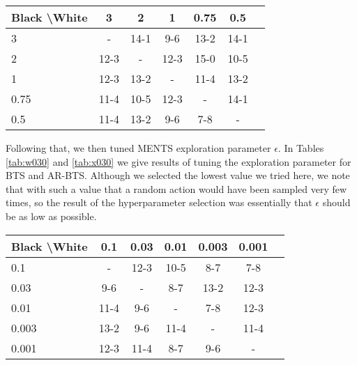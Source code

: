     \begin{table*}[]
    \centering
        \begin{tabular}{l|cccccc}
            \textbf{Black \textbackslash White}     & 3  & 2   & 1   & 0.75    & 0.5    \\ 
            \hline
                                    3            & - & 14-1 & 9-6 & 13-2 & 14-1   		\\
                                    2            & 12-3 & - & 12-3 & 15-0 & 10-5   		\\
                                    1          & 12-3 & 13-2 & - & 11-4 & 13-2   		\\
                                    0.75          & 11-4 & 10-5 & 12-3 & - & 14-1   		\\
                                    0.5         & 11-4 & 13-2 & 9-6 & 7-8 &   -   	\\   
        \end{tabular}
        \caption{Results for round robin to select the weighting of the prior policy $\epsilon_{\tilde{\lambda}}$ for AR-BTS. The value of 1.0 won the most matches so was selected. \label{tab:x020}}
    \end{table*}
    
    
    
    
    
    
    Following that, we then tuned MENTS exploration parameter $\epsilon$. In Tables \ref{tab:w030} and \ref{tab:x030} we give results of tuning the exploration parameter for BTS and AR-BTS. Although we selected the lowest value we tried here, we note that with such a value that a random action would have been sampled very few times, so the result of the hyperparameter selection was essentially that $\epsilon$ should be as low as possible.
    
    \begin{table*}[]
    \centering
        \begin{tabular}{l|cccccc}
            \textbf{Black \textbackslash White}     & 0.1  & 0.03   & 0.01   & 0.003    & 0.001    \\ 
            \hline
                                    0.1            & - & 12-3 & 10-5 & 8-7 & 7-8   		\\
                                    0.03            & 9-6 & - & 8-7 & 13-2 & 12-3   		\\
                                    0.01          & 11-4 & 9-6 & - & 7-8 & 12-3   		\\
                                    0.003          & 13-2 & 9-6 & 11-4 & - & 11-4   		\\
                                    0.001         & 12-3 & 11-4 & 8-7 & 9-6 &   -   	\\    
        \end{tabular}
        \caption{Results for round robin to select the exploration parameter $\epsilon$ for BTS. The value of 0.003 won the most matches so was selected. \label{tab:w030}}
    \end{table*}
    
